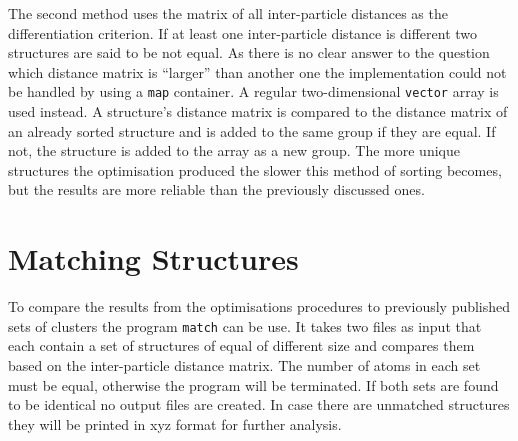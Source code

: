 The second method uses the matrix of all inter-particle distances as the
differentiation criterion. If at least one inter-particle distance is different
two structures are said to be not equal. As there is no clear answer to the
question which distance matrix is ``larger'' than another one the
implementation could not be handled by using a \verb|map| container. A regular
two-dimensional \verb|vector| array is used instead. A structure's distance
matrix is compared to the distance matrix of an already sorted structure and is
added to the same group if they are equal. If not, the structure is added to
the array as a new group. The more unique structures the optimisation produced
the slower this method of sorting becomes, but the results are more reliable
than the previously discussed ones.

\section{Matching Structures}
\label{sec:matchingstructures}

To compare the results from the optimisations procedures to previously
published sets of clusters the program \verb|match| can be use. It takes two
files as input that each contain a set of structures of equal of different size
and compares them based on the inter-particle distance matrix. The number of
atoms in each set must be equal, otherwise the program will be terminated. If
both sets are found to be identical no output files are created. In case there
are unmatched structures they will be printed in xyz format for further
analysis.

